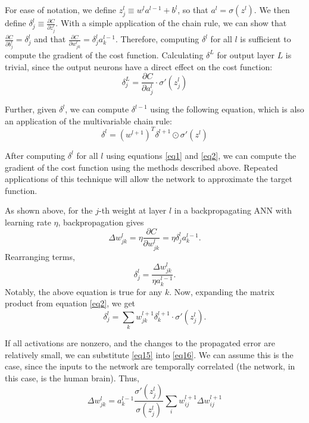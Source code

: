 \documentclass[12pt]{article}
\newcommand{\partialderiv}[2]{\frac{\partial #1}{\partial #2}}
\begin{document}
For ease of notation, we define $z_j^l \equiv w^l a^{l-1} + b^l$, so that $a^l = \sigma(z^l)$. We then define $\delta_j^l \equiv\partialderiv{C}{z_j^l}$. With a simple application of the chain rule, we can show that $\partialderiv{C}{b_j^l} = \delta_j^l$ and that $\partialderiv{C}{w_{jk}^l} = \delta_j^l a_k^{l-1}$. Therefore, computing $\delta^l$ for all $l$ is sufficient to compute the gradient of the cost function. Calculating $\delta^L$ for output layer $L$ is trivial, since the output neurons have a direct effect on the cost function:
\begin{equation}
	\delta_j^L = \partialderiv{C}{a_j^l}\cdot\sigma'\left(z_j^l\right)\label{eq1}
\end{equation}

Further, given $\delta^l$, we can compute $\delta^{l-1}$ using the following equation, which is also an application of the multivariable chain rule:
\begin{equation}
	\delta^l = \left(w^{l+1}\right)^T\delta^{l+1}\odot\sigma'\left(z^l\right)\label{eq2}
\end{equation}

After computing $\delta^l$ for all $l$ using equations \ref{eq1} and \ref{eq2}, we can compute the gradient of the cost function using the methods described above. Repeated applications of this technique will allow the network to approximate the target function.

As shown above, for the $j$-th weight at layer $l$ in a backpropagating ANN with learning rate $\eta$, backpropagation gives
\begin{equation}
	\Delta w_{jk}^l = \eta\partialderiv{C}{w_{jk}^l} = \eta\delta_{j}^l a_k^{l-1}.\label{eq15.5}
\end{equation}
Rearranging terms,
\begin{equation}
	\delta_j^l = \frac{\Delta w_{jk}^l}{\eta a_k^{l-1}}\label{eq15}.
\end{equation}
Notably, the above equation is true for any $k$. Now, expanding the matrix product from equation \ref{eq2}, we get
\begin{equation}
	\delta_j^l = \sum_k w_{jk}^{l+1} \delta_k^{l+1}\cdot\sigma'\left(z_j^l\right)\label{eq16}.
\end{equation}

If all activations are nonzero, and the changes to the propagated error are relatively small, we can substitute \ref{eq15} into \ref{eq16}. We can assume this is the case, since the inputs to the network are temporally correlated (the network, in this case, is the human brain). Thus,
\begin{equation}
	\Delta w_{jk}^l = a_k^{l-1}\frac{\sigma'\left(z_j^l\right)}{\sigma\left(z_j^l\right)}\sum_i w_{ij}^{l+1}\Delta w_{ij}^{l+1}
\end{equation}
\end{document}
